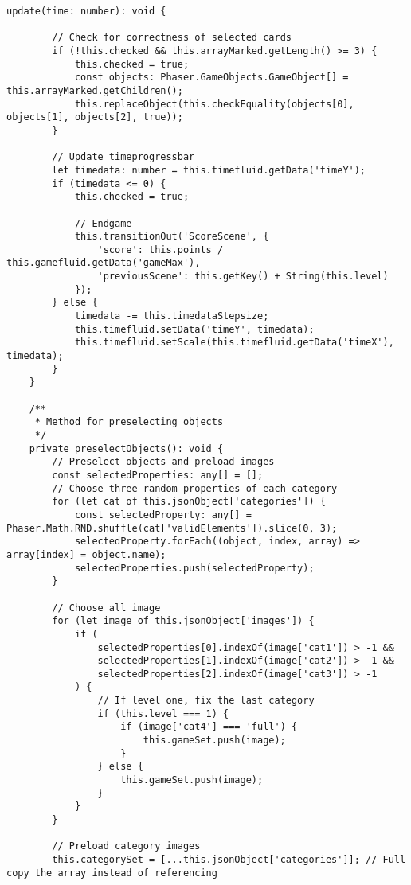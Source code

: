 \begin{lstlisting}[style=TypeScript, caption={gameScene.ts}]
    update(time: number): void {

        // Check for correctness of selected cards
        if (!this.checked && this.arrayMarked.getLength() >= 3) {
            this.checked = true;
            const objects: Phaser.GameObjects.GameObject[] = this.arrayMarked.getChildren();
            this.replaceObject(this.checkEquality(objects[0], objects[1], objects[2], true));
        }

        // Update timeprogressbar
        let timedata: number = this.timefluid.getData('timeY');
        if (timedata <= 0) {
            this.checked = true;

            // Endgame
            this.transitionOut('ScoreScene', {
                'score': this.points / this.gamefluid.getData('gameMax'),
                'previousScene': this.getKey() + String(this.level)
            });
        } else {
            timedata -= this.timedataStepsize;
            this.timefluid.setData('timeY', timedata);
            this.timefluid.setScale(this.timefluid.getData('timeX'), timedata);
        }
    }

    /**
     * Method for preselecting objects
     */
    private preselectObjects(): void {
        // Preselect objects and preload images
        const selectedProperties: any[] = [];
        // Choose three random properties of each category
        for (let cat of this.jsonObject['categories']) {
            const selectedProperty: any[] = Phaser.Math.RND.shuffle(cat['validElements']).slice(0, 3);
            selectedProperty.forEach((object, index, array) => array[index] = object.name);
            selectedProperties.push(selectedProperty);
        }

        // Choose all image
        for (let image of this.jsonObject['images']) {
            if (
                selectedProperties[0].indexOf(image['cat1']) > -1 &&
                selectedProperties[1].indexOf(image['cat2']) > -1 &&
                selectedProperties[2].indexOf(image['cat3']) > -1
            ) {
                // If level one, fix the last category
                if (this.level === 1) {
                    if (image['cat4'] === 'full') {
                        this.gameSet.push(image);
                    }
                } else {
                    this.gameSet.push(image);
                }
            }
        }

        // Preload category images
        this.categorySet = [...this.jsonObject['categories']]; // Full copy the array instead of referencing


\end{lstlisting}
